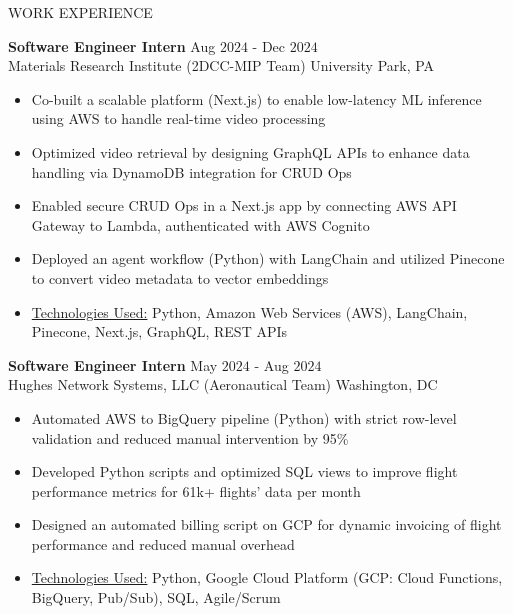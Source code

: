 \documentclass{resume} %
\begin{document}
\begin{rSection}{WORK EXPERIENCE}


{\bf Software Engineer Intern} \hfill Aug $2024$ - Dec $2024$\\
Materials Research Institute (2DCC-MIP Team) \hfill University Park, PA
\begin{itemize}[itemsep = -4pt]
    \item Co-built a scalable platform (Next.js) to enable low-latency ML inference using AWS to handle real-time video processing
    \item Optimized video retrieval by designing GraphQL APIs to enhance data handling via DynamoDB integration for CRUD Ops
    \item Enabled secure CRUD Ops in a Next.js app by connecting AWS API Gateway to Lambda, authenticated with AWS Cognito
    \item Deployed an agent workflow (Python) with LangChain and utilized Pinecone to convert video metadata to vector embeddings
    \item \underline{Technologies Used:} Python, Amazon Web Services (AWS), LangChain, Pinecone, Next.js, GraphQL, REST APIs
\end{itemize}

{\bf Software Engineer Intern} \hfill May $2024$ - Aug $2024$\\
Hughes Network Systems, LLC (Aeronautical Team) \hfill Washington, DC
\begin{itemize}[itemsep = -4pt]
    \item Automated AWS to BigQuery pipeline (Python) with strict row-level validation and reduced manual intervention by 95\%
    \item Developed Python scripts and optimized SQL views to improve flight performance metrics for 61k+ flights' data per month
    \item Designed an automated billing script on GCP for dynamic invoicing of flight performance and reduced manual overhead
    \item \underline{Technologies Used:} Python, Google Cloud Platform (GCP: Cloud Functions, BigQuery, Pub/Sub), SQL, Agile/Scrum
\end{itemize}


\end{rSection}
\end{document}
